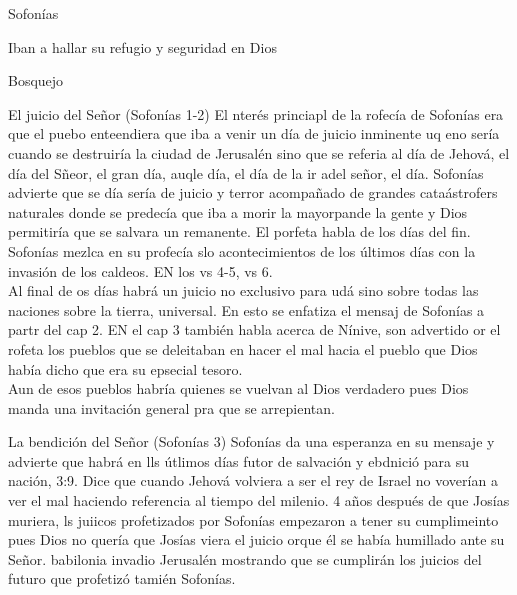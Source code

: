 \documentclass[12pt]{article}
\begin{document}
\begin{section}{Sofonías}
\begin{enumerate}
			Iban a hallar su refugio y seguridad en Dios
	\end{enumerate}
	\begin{subsection}{Bosquejo}
	\begin{subsubsection}{El juicio del Señor (Sofonías 1-2)}
		El nterés princiapl de la rofecía de Sofonías era que el puebo enteendiera que iba a venir un día de juicio inminente  uq eno sería cuando se destruiría la ciudad de Jerusalén sino que se referia al día de Jehová, el día del Sñeor, el gran día, auqle día, el día de la ir adel señor, el día. Sofonías advierte que se día sería de juicio y terror acompañado de grandes cataástrofers naturales donde se predecía que iba a morir la mayorpande la gente y Dios permitiría que se salvara un remanente. El porfeta habla de los días del fin.\\
		Sofonías mezlca en su profecía slo acontecimientos de los últimos días con la invasión de los caldeos. EN los vs 4-5, vs 6.\\
		Al final de os días habrá un juicio no exclusivo para udá sino sobre todas las naciones sobre la tierra, universal. En esto se enfatiza el mensaj de Sofonías a partr del cap 2. EN el cap 3 también habla acerca de Nínive, son advertido or el rofeta los pueblos que se deleitaban en hacer el mal hacia el pueblo que Dios había dicho que era su epsecial tesoro.\\
		Aun de esos pueblos habría quienes se vuelvan al Dios verdadero pues Dios manda una invitación general pra que se arrepientan.
	\end{subsubsection}
	\begin{subsubsection}{La bendición del Señor (Sofonías 3)}
		Sofonías da una esperanza en su mensaje y advierte que habrá en lls útlimos días futor de salvación y ebdnició para su nación, 3:9. Dice que cuando Jehová volviera a ser el rey de Israel no voverían a ver el mal haciendo referencia al tiempo del milenio. 4 años después de que Josías muriera, ls juiicos profetizados por Sofonías empezaron a tener su cumplimeinto pues Dios no quería que Josías viera el juicio orque él se había humillado ante su Señor. babilonia invadio Jerusalén mostrando que se cumplirán los juicios del futuro que profetizó tamién Sofonías.
	\end{subsubsection}
	\end{subsection}
\end{section}
\end{document}
